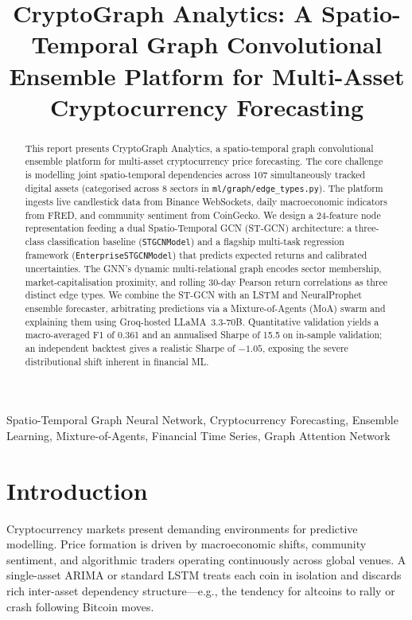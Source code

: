 \documentclass{article}
\title{CryptoGraph Analytics: A Spatio-Temporal Graph Convolutional Ensemble Platform for Multi-Asset Cryptocurrency Forecasting}
\begin{document}
\ninept
\maketitle

\begin{abstract}
This report presents CryptoGraph Analytics, a spatio-temporal graph convolutional ensemble platform for multi-asset cryptocurrency price forecasting. The core challenge is modelling joint spatio-temporal dependencies across 107 simultaneously tracked digital assets (categorised across 8 sectors in \texttt{ml/graph/edge\_types.py}). The platform ingests live candlestick data from Binance WebSockets, daily macroeconomic indicators from FRED, and community sentiment from CoinGecko. We design a 24-feature node representation feeding a dual Spatio-Temporal GCN (ST-GCN) architecture: a three-class classification baseline (\texttt{STGCNModel}) and a flagship multi-task regression framework (\texttt{EnterpriseSTGCNModel}) that predicts expected returns and calibrated uncertainties. The GNN's dynamic multi-relational graph encodes sector membership, market-capitalisation proximity, and rolling 30-day Pearson return correlations as three distinct edge types. We combine the ST-GCN with an LSTM and NeuralProphet ensemble forecaster, arbitrating predictions via a Mixture-of-Agents (MoA) swarm and explaining them using Groq-hosted LLaMA~3.3-70B. Quantitative validation yields a macro-averaged F1 of 0.361 and an annualised Sharpe of 15.5 on in-sample validation; an independent backtest gives a realistic Sharpe of $-1.05$, exposing the severe distributional shift inherent in financial ML.
\end{abstract}

\begin{keywords}
Spatio-Temporal Graph Neural Network, Cryptocurrency Forecasting, Ensemble Learning, Mixture-of-Agents, Financial Time Series, Graph Attention Network
\end{keywords}

\section{Introduction}

Cryptocurrency markets present demanding environments for predictive modelling. Price formation is driven by macroeconomic shifts, community sentiment, and algorithmic traders operating continuously across global venues. A single-asset ARIMA or standard LSTM treats each coin in isolation and discards rich inter-asset dependency structure---e.g., the tendency for altcoins to rally or crash following Bitcoin moves.
\end{document}
